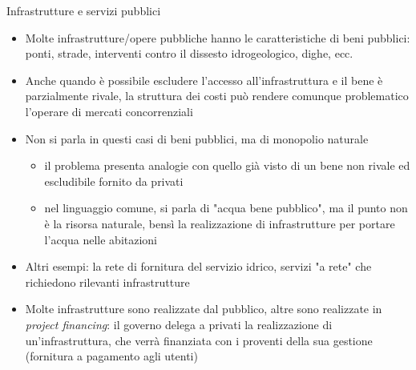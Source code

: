 \documentclass[aspectratio=64,11pt]{beamer}
\begin{document}
\begin{frame}{Infrastrutture e servizi pubblici}
\begin{itemize}
\item Molte infrastrutture/opere pubbliche hanno le caratteristiche di beni
pubblici: ponti, strade, interventi contro il dissesto idrogeologico, dighe,
ecc.
\item Anche quando è possibile escludere l'accesso all'infrastruttura e il bene è
parzialmente rivale, la struttura dei costi può rendere comunque problematico
l'operare di mercati concorrenziali
\item Non si parla in questi casi di beni pubblici, ma di \alert{monopolio naturale}
\begin{itemize}
\item il problema presenta analogie con quello già visto di un bene non rivale
ed escludibile fornito da privati
\item nel linguaggio comune, si parla di "acqua bene pubblico", ma il punto non
è la risorsa naturale, bensì la realizzazione di infrastrutture per
portare l'acqua nelle abitazioni
\end{itemize}
\item Altri esempi: la rete di fornitura del servizio idrico, servizi "a rete" che
richiedono rilevanti infrastrutture
\item Molte infrastrutture sono realizzate dal pubblico, altre sono realizzate in
\emph{project financing}: il governo delega a privati la realizzazione di
un'infrastruttura, che verrà finanziata con i proventi della sua gestione
(fornitura a pagamento agli utenti)
\end{itemize}
\end{frame}
\end{document}
